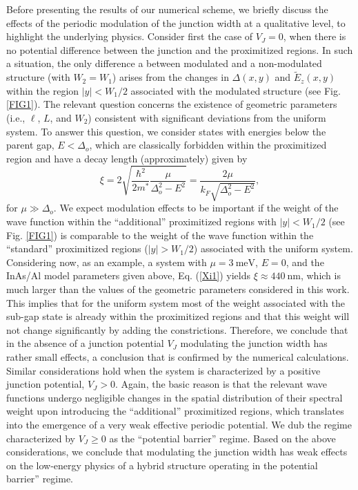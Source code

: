 \documentclass[twocolumn,aps,prb,nofootinbib]{revtex4-2}
\begin{document}
Before presenting the results of our numerical scheme, we briefly discuss the effects of the periodic modulation of the junction width at a qualitative level, to highlight the underlying physics. 
Consider first the case of $V_J = 0$, when there is no potential difference between the junction and the proximitized regions. In such a situation, the only difference a between modulated and a non-modulated structure (with $W_2=W_1$) arises from the changes in $\Delta(x,y)$ and $\widetilde{E}_z(x,y)$ within the region $|y| < W_1/2$ associated with the modulated structure (see Fig. \ref{FIG1}). The relevant question concerns the existence of geometric parameters (i.e., $\ell$, $L$, and $W_2$) consistent with significant deviations from the uniform system. To answer this question, we consider states with energies below the parent gap, $E < \Delta_o$, which are classically forbidden within the proximitized region and have a decay length (approximately) given by 
\begin{equation}
    \xi = 2\sqrt{\frac{\hbar^2}{2m^*} \frac{\mu}{\Delta_o^2 - E^2}}
    = \frac{2 \mu}{k_F \sqrt{\Delta_o^2 - E^2}}, \label{Xi1}
\end{equation}
for $\mu \gg \Delta_o$.  We expect modulation effects to be important if the weight of the wave function within the ``additional'' proximitized regions with $|y| < W_1/2$ (see Fig. \ref{FIG1}) is comparable to the weight of the wave function within the ``standard'' proximitized regions ($|y| > W_1/2$) associated with the uniform system.
 Considering now, as an example, a system with $\mu = 3~\text{meV}$, $E = 0$, and the InAs/Al model parameters given above, Eq. (\ref{Xi1}) yields $\xi \approx 440~\text{nm}$, which is much larger than the values of the geometric parameters considered in this work. This implies that for the uniform system most of the weight associated with the sub-gap state is already within the proximitized regions and that this weight will not change significantly by adding the constrictions. Therefore, we conclude that in the absence of a junction potential $V_J$ modulating the junction width has rather small effects, a conclusion that is confirmed by the numerical calculations. Similar considerations hold when the system is characterized by a positive junction potential, $V_J >0$. Again, the basic reason is that the relevant wave functions undergo negligible changes in the spatial distribution of their spectral weight upon introducing the ``additional'' proximitized regions, which translates into the emergence of a very weak effective periodic potential. 
 We dub the regime characterized by $V_J \geq 0$ as the ``potential barrier'' regime. Based on the above considerations, we conclude that modulating the junction width has weak effects on the low-energy physics of a hybrid structure operating in the potential barrier'' regime.
\end{document}

